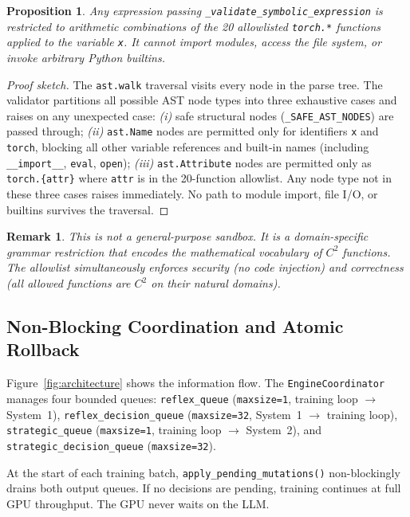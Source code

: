 \documentclass[11pt,a4paper]{article}
\newtheorem{proposition}{Proposition}
\newtheorem{remark}{Remark}
\begin{document}
\begin{proposition}
Any expression passing \texttt{\_validate\_symbolic\_expression} is restricted to
arithmetic combinations of the 20 allowlisted \texttt{torch.*} functions applied to
the variable \texttt{x}. It cannot import modules, access the file system, or invoke
arbitrary Python builtins.
\end{proposition}
\begin{proof}[Proof sketch]
The \texttt{ast.walk} traversal visits every node in the parse tree. The validator
partitions all possible AST node types into three exhaustive cases and raises on any
unexpected case: \emph{(i)} safe structural nodes (\texttt{\_SAFE\_AST\_NODES}) are
passed through; \emph{(ii)} \texttt{ast.Name} nodes are permitted only for
identifiers \texttt{x} and \texttt{torch}, blocking all other variable references and
built-in names (including \texttt{\_\_import\_\_}, \texttt{eval}, \texttt{open});
\emph{(iii)} \texttt{ast.Attribute} nodes are permitted only as
\texttt{torch.\{attr\}} where \texttt{attr} is in the 20-function allowlist. Any node
type not in these three cases raises immediately. No path to module import, file I/O,
or builtins survives the traversal.
\end{proof}

\begin{remark}
This is not a general-purpose sandbox. It is a domain-specific grammar restriction
that encodes the mathematical vocabulary of $C^2$ functions. The allowlist
simultaneously enforces security (no code injection) and correctness (all allowed
functions are $C^2$ on their natural domains).
\end{remark}

\subsection{Non-Blocking Coordination and Atomic Rollback}
\label{sec:agent:coord}

Figure~\ref{fig:architecture} shows the information flow. The \texttt{EngineCoordinator}
manages four bounded queues: \texttt{reflex\_queue} (\texttt{maxsize=1}, training
loop $\to$ System~1), \texttt{reflex\_decision\_queue} (\texttt{maxsize=32}, System~1
$\to$ training loop), \texttt{strategic\_queue} (\texttt{maxsize=1}, training loop
$\to$ System~2), and \texttt{strategic\_decision\_queue} (\texttt{maxsize=32}).

At the start of each training batch, \texttt{apply\_pending\_mutations()} non-blockingly
drains both output queues. If no decisions are pending, training continues at full GPU
throughput. The GPU never waits on the LLM.
\end{document}
